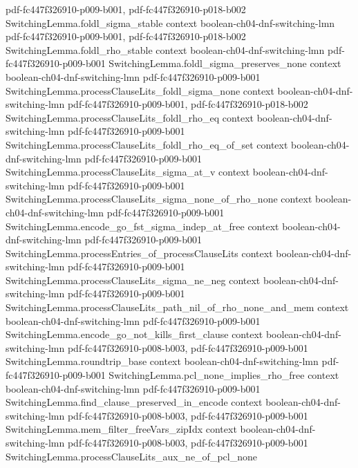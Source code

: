 \begin{theorem}
  {pdf-fc447f326910-p009-b001,
    pdf-fc447f326910-p018-b002}
\proofstep
  {SwitchingLemma.foldl_sigma_stable}
  {context}
  {boolean-ch04-dnf-switching-lmn}
  {pdf-fc447f326910-p009-b001,
    pdf-fc447f326910-p018-b002}
\proofstep
  {SwitchingLemma.foldl_rho_stable}
  {context}
  {boolean-ch04-dnf-switching-lmn}
  {pdf-fc447f326910-p009-b001}
\proofstep
  {SwitchingLemma.foldl_sigma_preserves_none}
  {context}
  {boolean-ch04-dnf-switching-lmn}
  {pdf-fc447f326910-p009-b001}
\proofstep
  {SwitchingLemma.processClauseLits_foldl_sigma_none}
  {context}
  {boolean-ch04-dnf-switching-lmn}
  {pdf-fc447f326910-p009-b001,
    pdf-fc447f326910-p018-b002}
\proofstep
  {SwitchingLemma.processClauseLits_foldl_rho_eq}
  {context}
  {boolean-ch04-dnf-switching-lmn}
  {pdf-fc447f326910-p009-b001}
\proofstep
  {SwitchingLemma.processClauseLits_foldl_rho_eq_of_set}
  {context}
  {boolean-ch04-dnf-switching-lmn}
  {pdf-fc447f326910-p009-b001}
\proofstep
  {SwitchingLemma.processClauseLits_sigma_at_v}
  {context}
  {boolean-ch04-dnf-switching-lmn}
  {pdf-fc447f326910-p009-b001}
\proofstep
  {SwitchingLemma.processClauseLits_sigma_none_of_rho_none}
  {context}
  {boolean-ch04-dnf-switching-lmn}
  {pdf-fc447f326910-p009-b001}
\proofstep
  {SwitchingLemma.encode_go_fst_sigma_indep_at_free}
  {context}
  {boolean-ch04-dnf-switching-lmn}
  {pdf-fc447f326910-p009-b001}
\proofstep
  {SwitchingLemma.processEntries_of_processClauseLits}
  {context}
  {boolean-ch04-dnf-switching-lmn}
  {pdf-fc447f326910-p009-b001}
\proofstep
  {SwitchingLemma.processClauseLits_sigma_ne_neg}
  {context}
  {boolean-ch04-dnf-switching-lmn}
  {pdf-fc447f326910-p009-b001}
\proofstep
  {SwitchingLemma.processClauseLits_path_nil_of_rho_none_and_mem}
  {context}
  {boolean-ch04-dnf-switching-lmn}
  {pdf-fc447f326910-p009-b001}
\proofstep
  {SwitchingLemma.encode_go_not_kills_first_clause}
  {context}
  {boolean-ch04-dnf-switching-lmn}
  {pdf-fc447f326910-p008-b003,
    pdf-fc447f326910-p009-b001}
\proofstep
  {SwitchingLemma.roundtrip_base}
  {context}
  {boolean-ch04-dnf-switching-lmn}
  {pdf-fc447f326910-p009-b001}
\proofstep
  {SwitchingLemma.pcl_none_implies_rho_free}
  {context}
  {boolean-ch04-dnf-switching-lmn}
  {pdf-fc447f326910-p009-b001}
\proofstep
  {SwitchingLemma.find_clause_preserved_in_encode}
  {context}
  {boolean-ch04-dnf-switching-lmn}
  {pdf-fc447f326910-p008-b003,
    pdf-fc447f326910-p009-b001}
\proofstep
  {SwitchingLemma.mem_filter_freeVars_zipIdx}
  {context}
  {boolean-ch04-dnf-switching-lmn}
  {pdf-fc447f326910-p008-b003,
    pdf-fc447f326910-p009-b001}
\proofstep
  {SwitchingLemma.processClauseLits_aux_ne_of_pcl_none}

\end{theorem}
